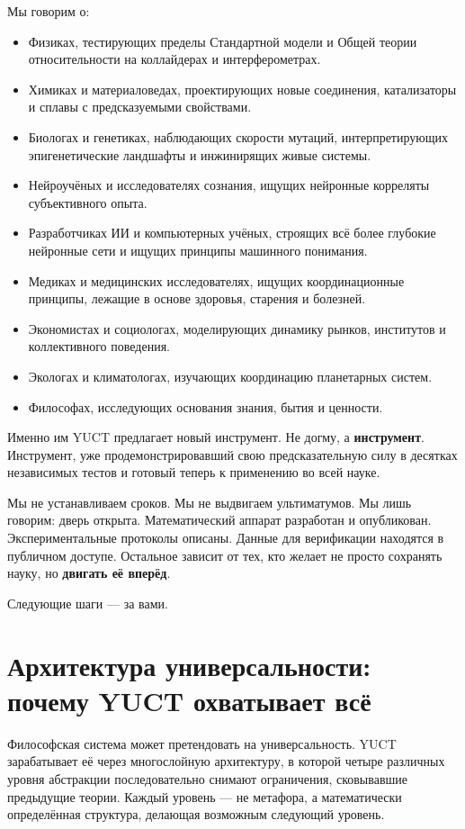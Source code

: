 \documentclass[12pt,a4paper]{article}
\begin{document}
	Мы говорим о:
	\begin{itemize}
		\item Физиках, тестирующих пределы Стандартной модели и Общей теории относительности на коллайдерах и интерферометрах.
		\item Химиках и материаловедах, проектирующих новые соединения, катализаторы и сплавы с предсказуемыми свойствами.
		\item Биологах и генетиках, наблюдающих скорости мутаций, интерпретирующих эпигенетические ландшафты и инжинирящих живые системы.
		\item Нейроучёных и исследователях сознания, ищущих нейронные корреляты субъективного опыта.
		\item Разработчиках ИИ и компьютерных учёных, строящих всё более глубокие нейронные сети и ищущих принципы машинного понимания.
		\item Медиках и медицинских исследователях, ищущих координационные принципы, лежащие в основе здоровья, старения и болезней.
		\item Экономистах и социологах, моделирующих динамику рынков, институтов и коллективного поведения.
		\item Экологах и климатологах, изучающих координацию планетарных систем.
		\item Философах, исследующих основания знания, бытия и ценности.
	\end{itemize}
	
	Именно им YUCT предлагает новый инструмент. Не догму, а \textbf{инструмент}. Инструмент, уже продемонстрировавший свою предсказательную силу в десятках независимых тестов и готовый теперь к применению во всей науке.
	
	Мы не устанавливаем сроков. Мы не выдвигаем ультиматумов. Мы лишь говорим: дверь открыта. Математический аппарат разработан и опубликован. Экспериментальные протоколы описаны. Данные для верификации находятся в публичном доступе. Остальное зависит от тех, кто желает не просто сохранять науку, но \textbf{двигать её вперёд}.
	
	Следующие шаги — за вами.
	
	\section{Архитектура универсальности: почему YUCT охватывает всё}
	\label{sec:architecture-of-universality}
	
	Философская система может претендовать на универсальность. YUCT зарабатывает её через многослойную архитектуру, в которой четыре различных уровня абстракции последовательно снимают ограничения, сковывавшие предыдущие теории. Каждый уровень — не метафора, а математически определённая структура, делающая возможным следующий уровень.
	
\end{document}
